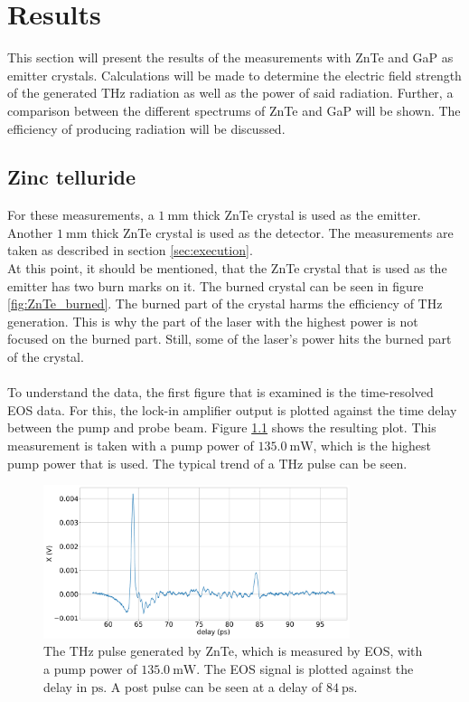 \chapter{Results}
This section will present the results of the measurements with ZnTe and GaP as emitter crystals.
Calculations will be made to determine the electric field strength of the generated $\si{\tera\hertz}$ radiation as well as the power of said radiation.
Further, a comparison between the different spectrums of ZnTe and GaP will be shown.
The efficiency of producing radiation will be discussed.

\section{Zinc telluride}
For these measurements, a $\SI{1}{\milli\meter}$ thick ZnTe crystal is used as the emitter.
Another $\SI{1}{\milli\meter}$ thick ZnTe crystal is used as the detector.
The measurements are taken as described in section \ref{sec:execution}.
\\
At this point, it should be mentioned, that the ZnTe crystal that is used as the emitter has two burn marks on it.
The burned crystal can be seen in figure \ref{fig:ZnTe_burned}.
The burned part of the crystal harms the efficiency of $\si{\tera\hertz}$ generation.
This is why the part of the laser with the highest power is not focused on the burned part.
Still, some of the laser's power hits the burned part of the crystal.
\\\\
To understand the data, the first figure that is examined is the time-resolved EOS data.
For this, the lock-in amplifier output is plotted against the time delay between the pump and probe beam.
Figure \ref{ZnTe:2_11_30_20_signal} shows the resulting plot.
This measurement is taken with a pump power of $\SI{135.0}{\milli\W}$, which is the highest pump power that is used.
The typical trend of a $\si{\tera\hertz}$ pulse can be seen.
\begin{figure}
    \centering
    \includegraphics[width=0.8\textwidth]{Plots/2_11_30_20normalX.pdf}
    \caption{The $\si{\tera\hertz}$ pulse generated by ZnTe, which is measured by EOS, with a pump power of $\SI{135.0}{\milli\W}$.
    The EOS signal is plotted against the delay in $\si{\pico\second}$.
    A post pulse can be seen at a delay of $\SI{84}{\pico\second}$.}
    \label{ZnTe:2_11_30_20_signal}
\end{figure}
